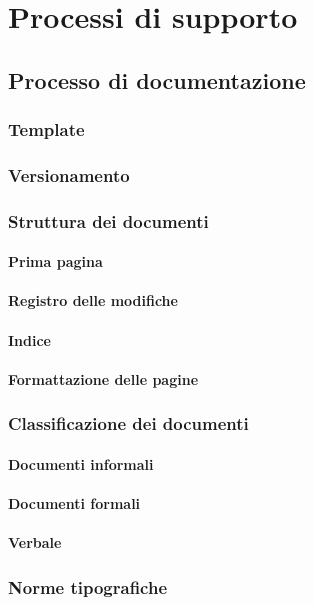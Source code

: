 \section{Processi di supporto}
\subsection{Processo di documentazione}
\subsubsection{Template}
\subsubsection{Versionamento}
\subsubsection{Struttura dei documenti}
\paragraph{Prima pagina}
\paragraph{Registro delle modifiche}
\paragraph{Indice}
\paragraph{Formattazione delle pagine}

\subsubsection{Classificazione dei documenti}
\paragraph{Documenti informali}
\paragraph{Documenti formali}
\paragraph{Verbale}

\subsubsection{Norme tipografiche}
